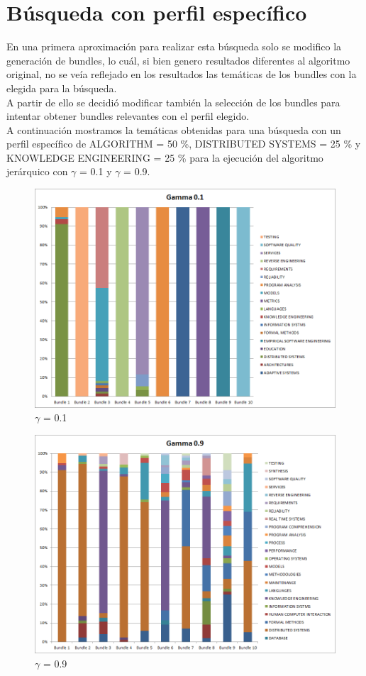 \section{Búsqueda con perfil específico}
En una primera aproximación para realizar esta búsqueda solo se modifico la generación de bundles, 
lo cuál, si bien genero resultados diferentes al algoritmo original, no se veía reflejado en los 
resultados las temáticas de los bundles con la elegida para la búsqueda. \\
A partir de ello se decidió modificar también la selección de los bundles para intentar obtener 
bundles relevantes con el perfil elegido. \\
A continuación mostramos la temáticas obtenidas para una búsqueda con un perfil específico de 
ALGORITHM = 50 \%, DISTRIBUTED SYSTEMS = 25 \% y KNOWLEDGE ENGINEERING = 25 \% para la ejecución 
del algoritmo jerárquico con $\gamma$ = 0.1 y $\gamma$ = 0.9.
\begin{figure}
  \centering
    \includegraphics[width=\textwidth]{resultados/papers/intra_inter/grafico_gamm01.png}
  \caption{$\gamma$ = 0.1}
  \label{res:img-gamma01-especifico}
\end{figure}

\begin{figure}
  \centering
    \includegraphics[width=\textwidth]{resultados/papers/intra_inter/grafico_gamm09.png}
  \caption{$\gamma$ = 0.9}
  \label{res:img-gamma09-especifico}
\end{figure}